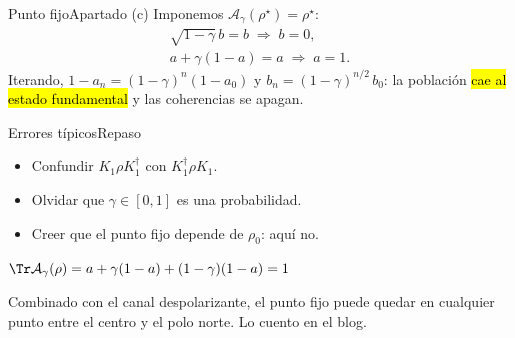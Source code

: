 \documentclass[12pt]{beamer}
\begin{document}
\begin{frame}{Punto fijo}{Apartado (c)}
Imponemos $\mathcal{A}_\gamma(\rho^\star) = \rho^\star$:
\begin{gather*}
  \sqrt{1-\gamma}\,b = b \;\Rightarrow\; b = 0,\\
  a + \gamma(1-a) = a \;\Rightarrow\; a = 1 .
\end{gather*}
Iterando, $1-a_n = (1-\gamma)^n(1-a_0)$ y $b_n = (1-\gamma)^{n/2}\, b_0$:
la población \hl{cae al estado fundamental} y las coherencias se apagan.
\end{frame}

\begin{frame}{Errores típicos}{Repaso}
\begin{itemize}
  \item Confundir $K_1\rho K_1^\dagger$ con $K_1^\dagger\rho K_1$.
  \item Olvidar que $\gamma \in [0,1]$ es una probabilidad.
  \item Creer que el punto fijo depende de $\rho_0$: aquí no.
\end{itemize}
\begin{thmbox}
\(
  \Tr\mathcal{A}_\gamma(\rho) = a + \gamma(1-a) + (1-\gamma)(1-a) = 1
\)
\end{thmbox}
\end{frame}

  {Combinado con el canal despolarizante, el punto fijo puede quedar en
   cualquier punto entre el centro y el polo norte. Lo cuento en el blog.}
\end{document}
